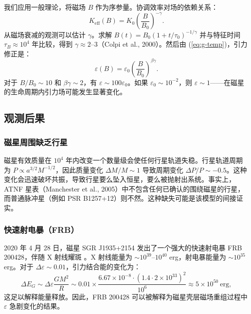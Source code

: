 \documentclass[12pt]{article}
\theoremstyle{remark}
\newcommand{\Keff}{K_{\mathrm{eff}}}
\newcommand{\eps}{\varepsilon}
\begin{document}
	我们应用一般理论，将磁场 $B$ 作为序参量。协调效率对场的依赖关系：
	\begin{equation}
		\Keff(B) = K_0 \left( \frac{B}{B_0} \right)^{-\gamma}.
		\label{eq:keff-b}
	\end{equation}
	从磁场衰减的观测可以估计 $\gamma$。求解 $B(t) = B_0 (1 + t/\tau_0)^{-1/\gamma}$ 并与特征时间 $\tau_B \approx 10^4$ 年比较，得到 $\gamma \approx 2$–$3$（Colpi et al., 2000）。然后由 (\ref{eq:g-temp})，引力修正是：
	\begin{equation}
		\eps(B) = \eps_0 \left( \frac{B}{B_0} \right)^{\beta\gamma}.
		\label{eq:eps-b}
	\end{equation}
	对于 $B/B_0 \sim 10$ 和 $\beta\gamma \sim 2$，有 $\eps \sim 100 \eps_0$。如果 $\eps_0 \sim 10^{-2}$，则 $\eps \sim 1$——在磁星的生命周期内引力场可能发生显著变化。
	
	\subsection{观测后果}
	\label{subsec:magnetars-consequences}
	
	\subsubsection{磁星周围缺乏行星}
	\label{subsubsec:magnetars-planets}
	
	磁星有效质量在 $10^4$ 年内改变一个数量级会使任何行星轨道失稳。行星轨道周期为 $P \propto a^{3/2} M^{-1/2}$，因此质量变化 $\Delta M/M \sim 1$ 导致周期变化 $\Delta P/P \sim -0.5$。这种变化会迅速破坏共振，导致行星要么坠入恒星，要么被抛射出系统。事实上，ATNF 星表（Manchester et al., 2005）中不包含任何已确认的围绕磁星的行星，而普通脉冲星（例如 PSR B1257+12）则不然。这种缺失可能是该模型的间接证实。
	
	\subsubsection{快速射电暴（FRB）}\label{subsec:magnetars-frb}
	
	2020 年 4 月 28 日，磁星 SGR J1935+2154 发出了一个强大的快速射电暴 FRB 200428，伴随 X 射线耀斑 \cite{Geng2020}。X 射线能量为 $\sim 10^{39}$–$10^{40}$ erg，射电暴能量为 $\sim 10^{35}$ erg。对于 $\Delta\eps \sim 0.01$，引力结合能的变化为：
	\begin{equation}
		\Delta E_G \sim \Delta\eps \frac{GM^2}{R} \sim 0.01 \times \frac{6.67\times10^{-8} \cdot (1.4\cdot 2\times10^{33})^2}{10^6} \approx 5\times10^{50}\ \text{erg},
	\end{equation}
	这足以解释能量释放。因此，FRB 200428 可以被解释为磁星壳层磁场重组过程中 $\eps$ 急剧变化的结果。
	
\end{document}
